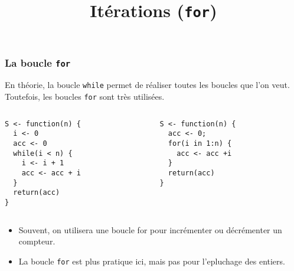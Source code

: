 \documentclass[10pt]{beamer}
\title{Itérations (\texttt{for})}
\begin{document}
\maketitle





\begin{frame}[fragile]
  \frametitle{La boucle \texttt{for}}
  
  En théorie, la boucle \texttt{while} permet de réaliser toutes les boucles que l'on veut.
  Toutefois, les boucles \texttt{for} sont très utilisées.

  
\begin{columns}[t]
\begin{column}{0.48\textwidth}
  \begin{lstlisting}[style=editor]
S <- function(n) {
  i <- 0
  acc <- 0
  while(i < n) {
    i <- i + 1
    acc <- acc + i
  }
  return(acc)
}    
\end{lstlisting}
\end{column}
\begin{column}{0.43\textwidth}
\begin{lstlisting}[style=editor]
S <- function(n) {
  acc <- 0;
  for(i in 1:n) {
    acc <- acc +i
  }
  return(acc)
}  
\end{lstlisting}
\end{column}
\end{columns}

\begin{itemize}
\item Souvent, on utilisera une boucle for pour incrémenter ou décrémenter un compteur.
\item La boucle \texttt{for} est plus pratique ici, mais pas pour l'epluchage des entiers.

\end{itemize}
\end{frame}
\end{document}
